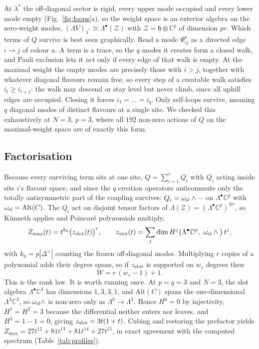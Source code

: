 \documentclass[10pt]{article}
\newcommand{\h}{\mathfrak{h}}
\newcommand{\Alt}{\mathrm{Alt}}
\begin{document}
At $\lambda^*$ the off-diagonal sector is rigid, every upper mode occupied and every lower mode empty
(Fig.~\ref{fig:loops}a), so the weight space is an exterior algebra on the zero-weight modes,
$(\Lambda V)_{\lambda^*}\cong\Lambda^\bullet(\mathcal Z)$ with $\mathcal Z=\h\otimes\mathbb C^p$ of dimension
$pr$. Which terms of $Q$ survive is best seen graphically. Read a mode $\Psi^a_{ij}$ as a directed edge $i\to j$
of colour $a$. A term is a trace, so the $q$ modes it creates form a closed walk, and Pauli exclusion lets it act
only if every edge of that walk is empty. At the maximal weight the empty modes are precisely those with $i>j$,
together with whatever diagonal flavours remain free, so every step of a creatable walk satisfies $i_t\ge
i_{t+1}$: the walk may descend or stay level but never climb, since all uphill edges are occupied. Closing it
forces $i_1=\dots=i_q$. Only self-loops survive, meaning $q$ diagonal modes of distinct flavours at a single
site. We checked this exhaustively at $N=3$, $p=3$, where all $192$ non-zero actions of $Q$ on the maximal-weight
space are of exactly this form.

\subsection{Factorisation}

Because every surviving term sits at one site, $Q=\sum_{i=1}^r Q_i$ with $Q_i$ acting inside site $i$'s flavour
space, and since the $q$ creation operators anticommute only the totally antisymmetric part of the coupling
survives: $Q_i=\omega_{\rm sl}\wedge-$ on $\Lambda^\bullet\mathbb C^p$ with $\omega_{\rm sl}=\Alt(C)$. The $Q_i$
act on disjoint tensor factors of $\Lambda(\mathcal Z)=(\Lambda^\bullet\mathbb C^p)^{\otimes r}$, so K\"unneth
applies and Poincar\'e polynomials multiply,
\begin{equation}
Z_{\max}(t)=t^{k_0}\big(z_{\rm slot}(t)\big)^{r},\qquad
z_{\rm slot}(t)=\sum_j\dim H^j\big(\Lambda^\bullet\mathbb C^p,\ \omega_{\rm sl}\wedge\big)\,t^j ,
\label{eq:kunneth}
\end{equation}
with $k_0=p|\Delta^+|$ counting the frozen off-diagonal modes. Multiplying $r$ copies of a polynomial adds their
degree spans, so if $z_{\rm slot}$ is supported on $w_s$ degrees then
\begin{equation}
W=r\,(w_s-1)+1 .
\label{eq:ranklaw}
\end{equation}
This is the rank law. It is worth running once. At $p=q=3$ and $N=3$, the slot algebra $\Lambda^\bullet\mathbb
C^3$ has dimensions $1,3,3,1$, and $\Alt(C)$ spans the one-dimensional $\Lambda^3\mathbb C^3$, so $\omega_{\rm
sl}\wedge$ is non-zero only as $\Lambda^0\to\Lambda^3$. Hence $H^0=0$ by injectivity, $H^1=H^2=3$ because the
differential neither enters nor leaves, and $H^3=1-1=0$, giving $z_{\rm slot}=3t(1+t)$. Cubing and restoring the
prefactor yields $Z_{\max}=27t^{12}+81t^{13}+81t^{14}+27t^{15}$, in exact agreement with the computed spectrum
(Table~\ref{tab:profiles}).
\end{document}
